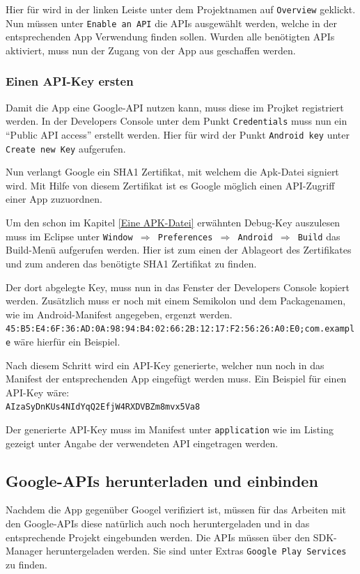 Hier f\"ur wird in der linken Leiste unter dem Projektnamen auf \texttt{Overview} geklickt. Nun m\"ussen unter \texttt{Enable an API} die APIs ausgew\"ahlt werden, welche in der entsprechenden App Verwendung finden sollen. Wurden alle ben\"otigten APIs aktiviert, muss nun der Zugang von der App aus geschaffen werden. \cite{GDevMaps}

\subsubsection{Einen API-Key ersten}
Damit die App eine Google-API nutzen kann, muss diese im Projket registriert werden. In der Developers Console unter dem Punkt \texttt{Credentials} muss nun ein "`Public API access"' erstellt werden. Hier f\"ur wird der Punkt \texttt{Android key} unter \texttt{Create new Key} aufgerufen. 

Nun verlangt Google ein SHA1 Zertifikat, mit welchem die Apk-Datei signiert wird. Mit Hilfe von diesem Zertifikat ist es Google m\"oglich einen API-Zugriff einer App zuzuordnen.

Um den schon im Kapitel \ref{Eine APK-Datei} erw\"ahnten Debug-Key auszulesen muss im Eclipse unter \texttt{Window $\Rightarrow$ Preferences $\Rightarrow$ Android $\Rightarrow$ Build} das Build-Men\"u aufgerufen werden. Hier ist zum einen der Ablageort des Zertifikates und zum anderen das ben\"otigte SHA1 Zertifikat zu finden.

Der dort abgelegte Key, muss nun in das Fenster der Developers Console kopiert werden. Zus\"atzlich muss er noch mit einem Semikolon und dem Packagenamen, wie im Android-Manifest angegeben, ergenzt werden. \\\texttt{45:B5:E4:6F:36:AD:0A:98:94:B4:02:66:2B:12:17:F2:56:26:A0:E0;com.example} w\"are hierf\"ur ein Beispiel. 
\cite{GolemHBGoogleServices} \cite{Android44}

Nach diesem Schritt wird ein API-Key generierte, welcher nun noch in das Manifest der entsprechenden App eingef\"ugt werden muss.
Ein Beispiel f\"ur einen API-Key w\"are: \\\texttt{AIzaSyDnKUs4NIdYqQ2EfjW4RXDVBZm8mvx5Va8}

Der generierte API-Key muss im Manifest unter \texttt{application} wie im Listing gezeigt unter Angabe der verwendeten API eingetragen werden. 


\subsection{Google-APIs herunterladen und einbinden}
Nachdem die App gegen\"uber Googel verifiziert ist, m\"ussen f\"ur das Arbeiten mit den Google-APIs diese nat\"urlich auch noch heruntergeladen und in das entsprechende Projekt eingebunden werden. Die APIs m\"ussen \"uber den \ac{SDK}-Manager heruntergeladen werden. Sie sind unter Extras \texttt{Google Play Services} zu finden.

